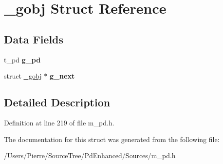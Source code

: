 \hypertarget{struct__gobj}{\section{\-\_\-gobj Struct Reference}
\label{struct__gobj}
}
\subsection*{Data Fields}
\begin{DoxyCompactItemize}
\item 
\hypertarget{struct__gobj_aeb4882e0afbd07827beea5cb2024b4ac}{t\-\_\-pd {\bfseries g\-\_\-pd}}\label{struct__gobj_aeb4882e0afbd07827beea5cb2024b4ac}

\item 
\hypertarget{struct__gobj_abb00f331d612607d8138bd9a750c1e2f}{struct \hyperlink{struct__gobj}{\-\_\-gobj} $\ast$ {\bfseries g\-\_\-next}}\label{struct__gobj_abb00f331d612607d8138bd9a750c1e2f}

\end{DoxyCompactItemize}


\subsection{Detailed Description}


Definition at line 219 of file m\-\_\-pd.\-h.



The documentation for this struct was generated from the following file\-:\begin{DoxyCompactItemize}
\item 
/\-Users/\-Pierre/\-Source\-Tree/\-Pd\-Enhanced/\-Sources/m\-\_\-pd.\-h\end{DoxyCompactItemize}

